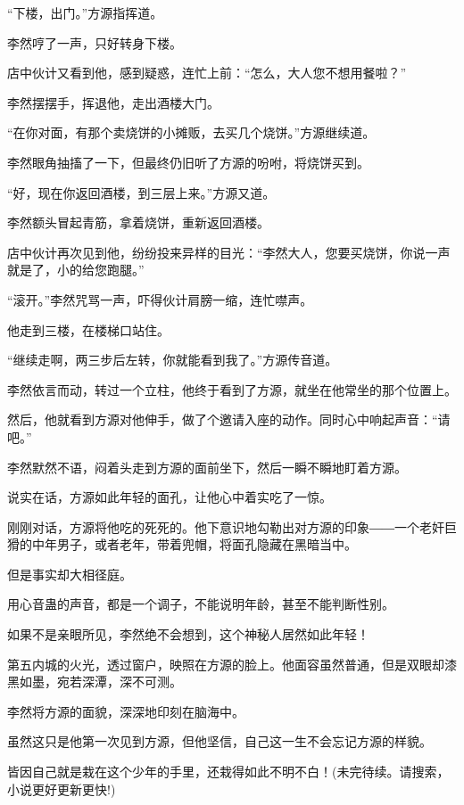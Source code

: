\begin{this_body}
“下楼，出门。”方源指挥道。

李然哼了一声，只好转身下楼。

店中伙计又看到他，感到疑惑，连忙上前：“怎么，大人您不想用餐啦？”

李然摆摆手，挥退他，走出酒楼大门。

“在你对面，有那个卖烧饼的小摊贩，去买几个烧饼。”方源继续道。

李然眼角抽搐了一下，但最终仍旧听了方源的吩咐，将烧饼买到。

“好，现在你返回酒楼，到三层上来。”方源又道。

李然额头冒起青筋，拿着烧饼，重新返回酒楼。

店中伙计再次见到他，纷纷投来异样的目光：“李然大人，您要买烧饼，你说一声就是了，小的给您跑腿。”

“滚开。”李然咒骂一声，吓得伙计肩膀一缩，连忙噤声。

他走到三楼，在楼梯口站住。

“继续走啊，两三步后左转，你就能看到我了。”方源传音道。

李然依言而动，转过一个立柱，他终于看到了方源，就坐在他常坐的那个位置上。

然后，他就看到方源对他伸手，做了个邀请入座的动作。同时心中响起声音：“请吧。”

李然默然不语，闷着头走到方源的面前坐下，然后一瞬不瞬地盯着方源。

说实在话，方源如此年轻的面孔，让他心中着实吃了一惊。

刚刚对话，方源将他吃的死死的。他下意识地勾勒出对方源的印象――一个老奸巨猾的中年男子，或者老年，带着兜帽，将面孔隐藏在黑暗当中。

但是事实却大相径庭。

用心音蛊的声音，都是一个调子，不能说明年龄，甚至不能判断性别。

如果不是亲眼所见，李然绝不会想到，这个神秘人居然如此年轻！

第五内城的火光，透过窗户，映照在方源的脸上。他面容虽然普通，但是双眼却漆黑如墨，宛若深潭，深不可测。

李然将方源的面貌，深深地印刻在脑海中。

虽然这只是他第一次见到方源，但他坚信，自己这一生不会忘记方源的样貌。

皆因自己就是栽在这个少年的手里，还栽得如此不明不白！(未完待续。请搜索，小说更好更新更快!)

\end{this_body}

